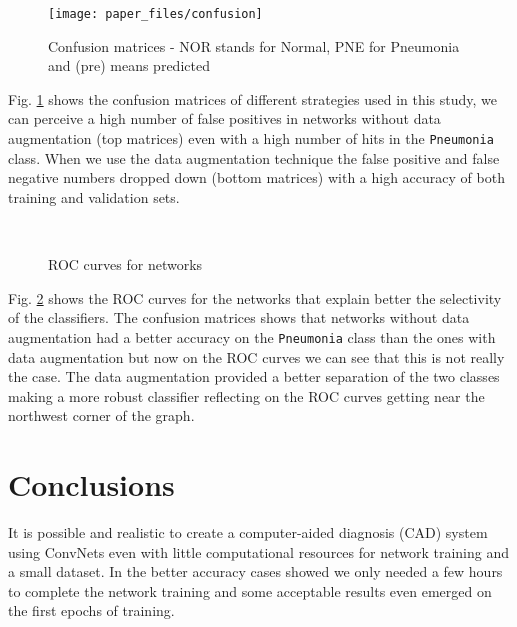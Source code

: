 \documentclass[twocolumn]{article}
\newcommand{\tamfig}{0.9}
\newcommand{\tammeiafig}{0.45}
\begin{document}
\begin{figure}[h]
\texttt{[image: paper\_files/confusion]}
\caption[Confusion matrices]{Confusion matrices - NOR stands for Normal, PNE for Pneumonia and (pre) means predicted}
\label{grafico_confusao}
\end{figure}

Fig. \ref{grafico_confusao} shows the confusion matrices of different strategies used in this study, we can perceive a high number of false positives in networks without data augmentation (top matrices) even with a high number of hits in the \texttt{Pneumonia} class. When we use the data augmentation technique the false positive and false negative numbers dropped down (bottom matrices) with a high accuracy of both training and validation sets.

\begin{figure}[h]
{}
\\
\caption{ROC curves for networks}
\label{grafico_roc}
\end{figure}

Fig. \ref{grafico_roc} shows the ROC curves for the networks that explain better the selectivity  of the classifiers. The confusion matrices shows that networks without data augmentation had a better accuracy on the \texttt{Pneumonia} class than the ones with data augmentation but now on the ROC curves we can see that this is not really the case. The data augmentation provided a better separation of the two classes making a more robust classifier reflecting on the ROC curves getting near the northwest corner of the graph.


\section{Conclusions}
It is possible and realistic to create a computer-aided diagnosis (CAD) system using ConvNets even with little computational resources for network training and a small dataset. In the better accuracy cases showed we only needed a few hours to complete the network training and some acceptable results even emerged on the first epochs of training.
\end{document}
